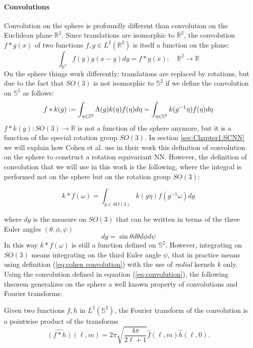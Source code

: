 \paragraph{Convolutions}
Convolution on the sphere is profoundly different than convolution on the Euclidean plane $\mathbb R^2$. Since translations are isomorphic to $\mathbb R^2$, the convolution $f*g(x)$ of two functions $f, g \in L^2(\mathbb R^2)$ is itself a function on the plane:
\begin{equation}\label{eq:plane convolution}
	 \int_{\mathbb R^2} f(y)g(x-y)dy = f*g(x):\quad \mathbb R^2 \to\mathbb R
\end{equation}
On the sphere things work differently: translations are replaced by rotations, but due to the fact that $SO(3)$ is not isomorphic to $\mathbb S^2$ if we define the convolution on $\mathbb S^2$ as follows:
\begin{equation} \label{eq:cohen convolution}
f* k(g) := \int_{\eta \in \mathbb S^2} \Lambda(g)k( \eta) f(\eta) d\eta=\int_{\eta \in \mathbb S^2} k(g^{-1} \eta) f(\eta) d\eta\\ 
\end{equation}
$f*k(g): SO(3)\to\mathbb R$ is not a function of the sphere anymore, but it is a function of the special rotation group $SO(3)$. In section \ref{sec:Chapter1:SCNN} we will explain how Cohen et al. \cite{SCNN} use in their work this definition of convolution on the sphere to construct a rotation equivariant NN. However, the definition of convolution that we will use in this work is the following, where the integral is performed not on the sphere but on the rotation group $SO(3)$:

\begin{equation}\label{eq:convolution}
 k * f(\omega)=\int_{g \in S O(3)} k(g \eta) f\left(g^{-1} \omega\right) d g 
\end{equation}

where $dg$ is the measure on $SO(3)$ that can be written in terms of the three Euler angles $(\theta, \phi, \psi)$ 
$$dg=\sin\theta d\theta d\phi d\psi$$
In this way $k * f(\omega)$ is still a function defined on $\mathbb S^2$. However, integrating on $SO(3)$ means integrating on the third Euler angle $\psi$, that in practice means using definition (\ref{eq:cohen convolution}) with the use of \textit{radial} kernels $k$ only.
Using the convolution defined in equation (\ref{eq:convolution}), the following theorem \cite{Driscoll:1994:CFT:184069.184073} generalizes on the sphere a well known property of convolutions and Fourier transforms: 
\vspace{0.5cm}
\begin{theorem}\label{theo:convolution}
	Given two functions $f, h$ in $L^2(\mathbb S^2)$, the Fourier transform of the convolution is a pointwise product of the transforms
$$
\hat{(f * h)}(\ell, m)=2 \pi \sqrt{\frac{4 \pi}{2 \ell+1}} \hat{f}(\ell, m) \hat{h}(\ell, 0).
$$
\end{theorem}
\vspace{0.5cm}

